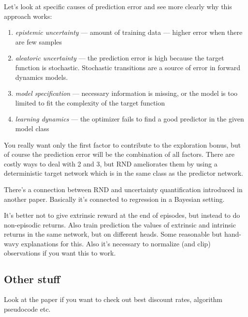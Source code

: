 \documentclass{article}
\begin{document}
Let's look at specific causes of prediction error and see more clearly why this approach works:
\begin{enumerate}
		\item \textit{epistemic uncertainty} ---  amount of training data --- higher error when there are few samples
		\item \textit{aleatoric uncertainty} --- the prediction error is high because the target function is stochastic.
				Stochastic transitions are a source of error in forward dynamics models.
		\item \textit{model specification} --- necessary information is missing, or the 
				model is too limited to fit the complexity of the target function
		\item \textit{learning dynamics} --- the optimizer fails to find a good predictor in the given model class
\end{enumerate}
You really want only the first factor to contribute to the exploration bonus, 
but of course the prediction error will be the combination of all factors.
There are costly ways to deal with 2 and 3, but RND ameliorates them by using
a deterministic target network which is in the same class as the predictor network.



There's a connection between RND and uncertainty quantification introduced in another paper.
Basically it's connected to regression in a Bayesian setting.

It's better not to give extrinsic reward at the end of episodes,
but instead to do non-episodic returns.
Also train prediction the values of extrinsic and intrinsic returns in the same network,
but on different heads. Some reasonable but hand-wavy explanations for this.
Also it's necessary to normalize (and clip) observations if you want this to work.

\subsection{Other stuff}
Look at the paper if you want to check out best discount rates, algorithm pseudocode etc.
\end{document}
